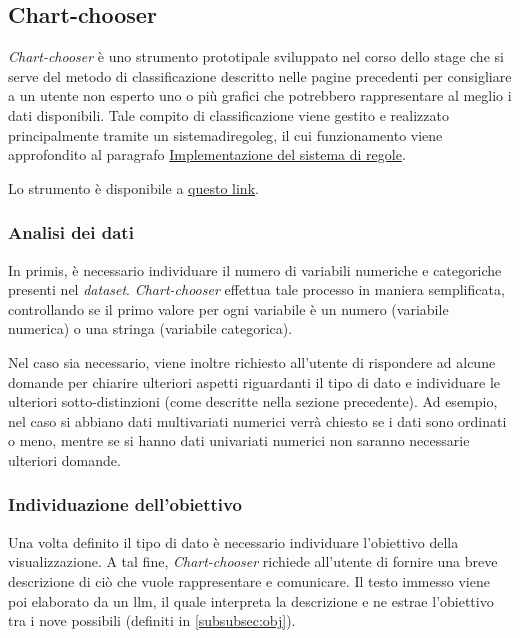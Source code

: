 \subsection{Chart-chooser}
\emph{Chart-chooser} è uno strumento prototipale sviluppato nel corso dello stage che si serve del metodo di classificazione descritto 
nelle pagine precedenti per consigliare a un utente non esperto uno o più grafici che potrebbero rappresentare al meglio i dati disponibili.
Tale compito di classificazione viene gestito e realizzato principalmente tramite un \gls{sistemadiregoleg}, il cui funzionamento viene approfondito al paragrafo
\hyperref[subsubsec:rules]{Implementazione del sistema di regole}.

Lo strumento è disponibile a \href{http://www.overleaf.com}{questo link}.

\subsubsection{Analisi dei dati}
In primis, è necessario individuare il numero di variabili numeriche e categoriche presenti nel \emph{dataset}.
\emph{Chart-chooser} effettua tale processo in maniera semplificata, controllando se il primo valore per ogni variabile
è un numero (variabile numerica) o una stringa (variabile categorica).

Nel caso sia necessario, viene inoltre richiesto all'utente di rispondere ad alcune domande per chiarire ulteriori aspetti riguardanti il tipo 
di dato e individuare le ulteriori sotto-distinzioni (come descritte nella sezione precedente). Ad esempio, nel caso si abbiano dati multivariati numerici verrà chiesto 
se i dati sono ordinati o meno, mentre se si hanno dati univariati numerici non saranno necessarie ulteriori domande.

\subsubsection{Individuazione dell'obiettivo}
Una volta definito il tipo di dato è necessario individuare l'obiettivo della visualizzazione.
A tal fine, \emph{Chart-chooser} richiede all'utente di fornire una breve descrizione di ciò che vuole rappresentare e comunicare.
Il testo immesso viene poi elaborato da un \gls{llm}, il quale interpreta la descrizione e ne estrae l'obiettivo tra i nove possibili (definiti in \ref{subsubsec:obj}). 

